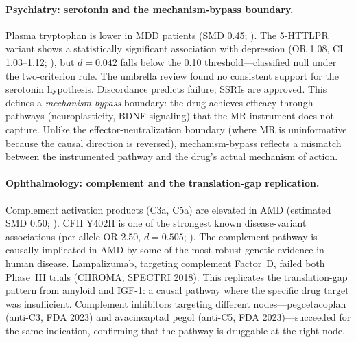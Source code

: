 \documentclass[11pt]{article}
\begin{document}
\paragraph{Psychiatry: serotonin and the mechanism-bypass boundary.}
Plasma tryptophan is lower in MDD patients (SMD 0.45; \cite{ogawa2014}). The 5-HTTLPR variant shows a statistically significant association with depression (OR 1.08, CI 1.03--1.12; \cite{clarke2010serotonin}), but $d = 0.042$ falls below the 0.10 threshold---classified null under the two-criterion rule. The \citet{moncrieff2022} umbrella review found no consistent support for the serotonin hypothesis. Discordance predicts failure; SSRIs are approved. This defines a \emph{mechanism-bypass} boundary: the drug achieves efficacy through pathways (neuroplasticity, BDNF signaling) that the MR instrument does not capture. Unlike the effector-neutralization boundary (where MR is uninformative because the causal direction is reversed), mechanism-bypass reflects a mismatch between the instrumented pathway and the drug's actual mechanism of action.

\paragraph{Ophthalmology: complement and the translation-gap replication.}
Complement activation products (C3a, C5a) are elevated in AMD (estimated SMD 0.50; \cite{reynolds2009}). CFH Y402H is one of the strongest known disease-variant associations (per-allele OR 2.50, $d = 0.505$; \cite{thakkinstian2006}). The complement pathway is causally implicated in AMD by some of the most robust genetic evidence in human disease. Lampalizumab, targeting complement Factor~D, failed both Phase~III trials (CHROMA, SPECTRI 2018). This replicates the translation-gap pattern from amyloid and IGF-1: a causal pathway where the specific drug target was insufficient. Complement inhibitors targeting different nodes---pegcetacoplan (anti-C3, FDA 2023) and avacincaptad pegol (anti-C5, FDA 2023)---succeeded for the same indication, confirming that the pathway is druggable at the right node.
\end{document}
